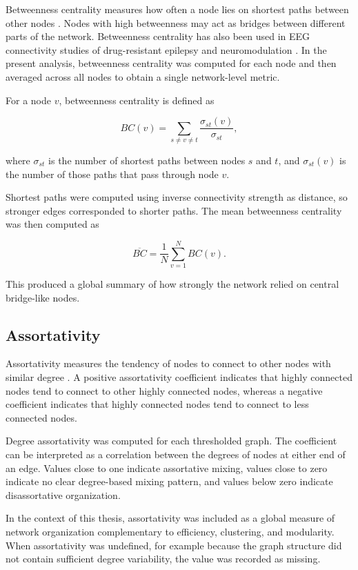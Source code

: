 Betweenness centrality measures how often a node lies on shortest paths between
other nodes \cite{Freeman1977,Rubinov2010}. Nodes with high betweenness may act as bridges between different
parts of the network. Betweenness centrality has also been used in EEG connectivity studies of drug-resistant epilepsy and neuromodulation \cite{Lanzone2022}. 
In the present analysis, betweenness centrality was
computed for each node and then averaged across all nodes to obtain a single
network-level metric.

For a node $v$, betweenness centrality is defined as

\[
    BC(v)
    =
    \sum_{s \neq v \neq t}
    \frac{\sigma_{st}(v)}{\sigma_{st}},
\]

where $\sigma_{st}$ is the number of shortest paths between nodes $s$ and $t$,
and $\sigma_{st}(v)$ is the number of those paths that pass through node $v$.

Shortest paths were computed using inverse connectivity strength as distance,
so stronger edges corresponded to shorter paths. The mean betweenness
centrality was then computed as

\[
    \overline{BC}
    =
    \frac{1}{N}
    \sum_{v=1}^{N} BC(v).
\]

This produced a global summary of how strongly the network relied on central
bridge-like nodes.

\subsection{Assortativity}
\label{subsec:assortativity}

Assortativity measures the tendency of nodes to connect to other nodes with
similar degree \cite{Newman2002,Rubinov2010}. A positive assortativity coefficient indicates that highly
connected nodes tend to connect to other highly connected nodes, whereas a
negative coefficient indicates that highly connected nodes tend to connect to
less connected nodes.

Degree assortativity was computed for each thresholded graph. The coefficient
can be interpreted as a correlation between the degrees of nodes at either end
of an edge. Values close to one indicate assortative mixing, values close to
zero indicate no clear degree-based mixing pattern, and values below zero
indicate disassortative organization.

In the context of this thesis, assortativity was included as a global measure
of network organization complementary to efficiency, clustering, and modularity.
When assortativity was undefined, for example because the graph structure did
not contain sufficient degree variability, the value was recorded as missing.

